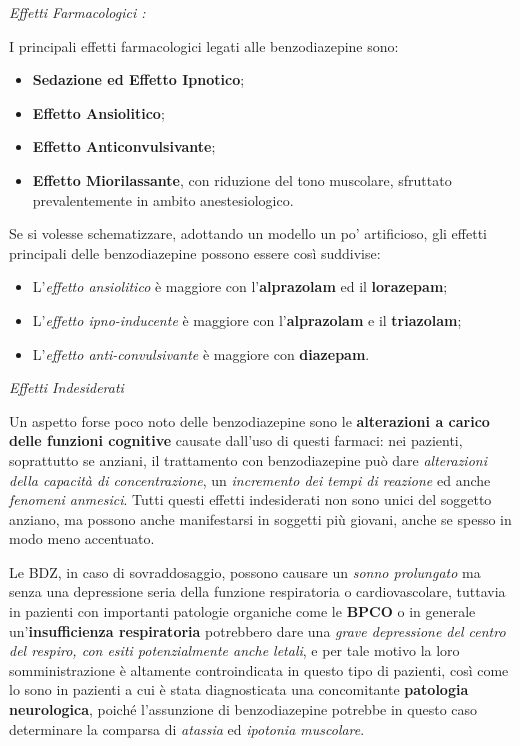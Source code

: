 \begin{itemize}
\emph{\emph{Effetti Farmacologici :}}

I principali effetti farmacologici legati alle benzodiazepine sono:

\begin{itemize}
\item
  \textbf{Sedazione ed Effetto Ipnotico};
\item
  \textbf{Effetto Ansiolitico};
\item
  \textbf{Effetto Anticonvulsivante};
\item
  \textbf{Effetto Miorilassante}, con riduzione del tono muscolare,
  sfruttato prevalentemente in ambito anestesiologico.
\end{itemize}

Se si volesse schematizzare, adottando un modello un po' artificioso,
gli effetti principali delle benzodiazepine possono essere così
suddivise:

\begin{itemize}
\item
  L'\emph{effetto ansiolitico} è maggiore con l'\textbf{alprazolam} ed
  il \textbf{lorazepam};
\item
  L'\emph{effetto ipno-inducente} è maggiore con l'\textbf{alprazolam} e
  il \textbf{triazolam};
\item
  L'\emph{effetto anti-convulsivante} è maggiore con \textbf{diazepam}.
\end{itemize}

\emph{\emph{Effetti Indesiderati}}

Un aspetto forse poco noto delle benzodiazepine sono le
\textbf{alterazioni a carico delle funzioni cognitive} causate dall'uso
di questi farmaci: nei pazienti, soprattutto se anziani, il trattamento
con benzodiazepine può dare \emph{alterazioni della capacità di
concentrazione}, un \emph{incremento dei tempi di reazione} ed anche
\emph{fenomeni anmesici}. Tutti questi effetti indesiderati non sono
unici del soggetto anziano, ma possono anche manifestarsi in soggetti
più giovani, anche se spesso in modo meno accentuato.

Le BDZ, in caso di sovraddosaggio, possono causare un \emph{sonno
prolungato} ma senza una depressione seria della funzione respiratoria o
cardiovascolare, tuttavia in pazienti con importanti patologie organiche
come le \textbf{BPCO} o in generale un'\textbf{insufficienza
respiratoria} potrebbero dare una \emph{grave depressione del centro del
respiro, con esiti potenzialmente anche letali}, e per tale motivo la
loro somministrazione è altamente controindicata in questo tipo di
pazienti, così come lo sono in pazienti a cui è stata diagnosticata una
concomitante \textbf{patologia neurologica}, poiché l'assunzione di
benzodiazepine potrebbe in questo caso determinare la comparsa di
\emph{atassia} ed \emph{ipotonia muscolare}.


\end{itemize}

